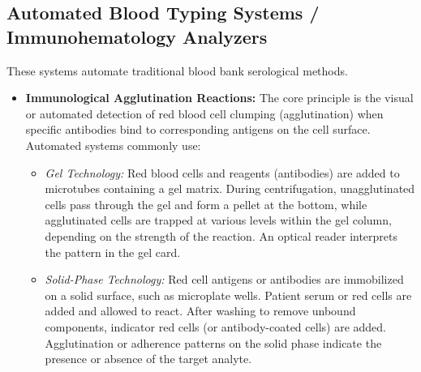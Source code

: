 \documentclass{article}
\begin{document}
\subsection{Automated Blood Typing Systems / Immunohematology Analyzers}
These systems automate traditional blood bank serological methods.
\begin{itemize}
    \item \textbf{Immunological Agglutination Reactions:} The core principle is the visual or automated detection of red blood cell clumping (agglutination) when specific antibodies bind to corresponding antigens on the cell surface. Automated systems commonly use:
    \begin{itemize}
        \item \textit{Gel Technology:} Red blood cells and reagents (antibodies) are added to microtubes containing a gel matrix. During centrifugation, unagglutinated cells pass through the gel and form a pellet at the bottom, while agglutinated cells are trapped at various levels within the gel column, depending on the strength of the reaction. An optical reader interprets the pattern in the gel card.
        \item \textit{Solid-Phase Technology:} Red cell antigens or antibodies are immobilized on a solid surface, such as microplate wells. Patient serum or red cells are added and allowed to react. After washing to remove unbound components, indicator red cells (or antibody-coated cells) are added. Agglutination or adherence patterns on the solid phase indicate the presence or absence of the target analyte.
    \end{itemize}
\end{itemize}
\end{document}
